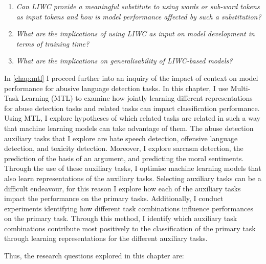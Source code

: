 \begin{center}
\begin{minipage}{0.9\textwidth}
\vspace{5mm}
    \begin{enumerate}[start=3, label={\textbf{RQ \arabic*}}]
        \item{\textit{Can LIWC provide a meaningful substitute to using words or sub-word tokens as input tokens and how is model performance affected by such a substitution?}}
        \item{\textit{What are the implications of using LIWC as input on model development in terms of training time?}}
        \item{\textit{What are the implications on generalisability of LIWC-based models?}}
    \end{enumerate}
    \vspace{5mm}
\end{minipage}
\end{center}

In \cref{chap:mtl} I proceed further into an inquiry of the impact of context on model performance for abusive language detection tasks.
In this chapter, I use Multi-Task Learning (MTL) to examine how jointly learning different representations for abuse detection tasks and related tasks can impact classification performance.
Using MTL, I explore hypotheses of which related tasks are related in such a way that machine learning models can take advantage of them.
The abuse detection auxiliary tasks that I explore are hate speech detection, offensive language detection, and toxicity detection.
Moreover, I explore sarcasm detection, the prediction of the basis of an argument, and predicting the moral sentiments.
Through the use of these auxiliary tasks, I optimise machine learning models that also learn representations of the auxiliary tasks.
Selecting auxiliary tasks can be a difficult endeavour, for this reason I explore how each of the auxiliary tasks impact the performance on the primary tasks.
Additionally, I conduct experiments identifying how different task combinations influence performances on the primary task.
Through this method, I identify which auxiliary task combinations contribute most positively to the classification of the primary task through learning representations for the different auxiliary tasks.

Thus, the research questions explored in this chapter are:

